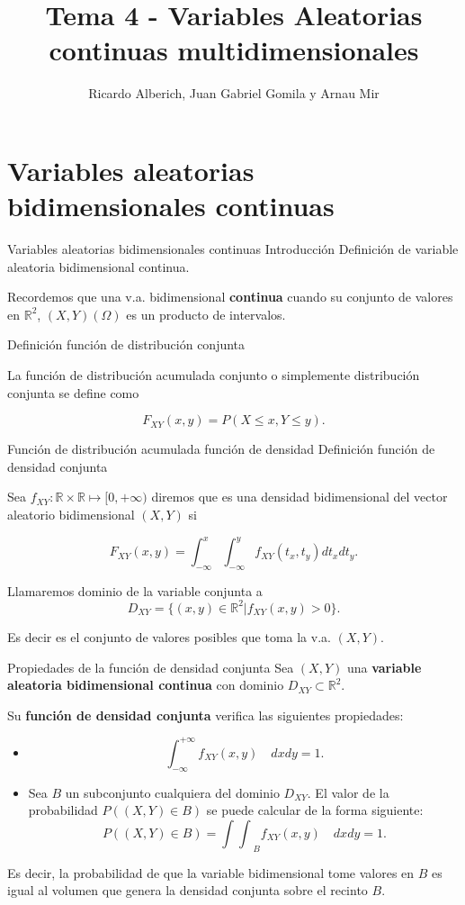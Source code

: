 \documentclass[
  ignorenonframetext,
]{beamer}
\title{Tema 4 - Variables Aleatorias continuas multidimensionales}
\author{Ricardo Alberich, Juan Gabriel Gomila y Arnau Mir}
\date{}
\begin{document}
\frame{\titlepage}

\hypertarget{variables-aleatorias-bidimensionales-continuas}{%
\section{Variables aleatorias bidimensionales
continuas}\label{variables-aleatorias-bidimensionales-continuas}}

\begin{frame}{Variables aleatorias bidimensionales continuas
Introducción}
\protect\hypertarget{variables-aleatorias-bidimensionales-continuas-introducciuxf3n}{}
Definición de variable aleatoria bidimensional continua.

Recordemos que una v.a. bidimensional \textbf{continua} cuando su
conjunto de valores en \(\mathbb{R}^2\), \((X,Y)(\Omega)\) es un
producto de intervalos.

Definición función de distribución conjunta

La función de distribución acumulada conjunto o simplemente distribución
conjunta se define como

\[F_{XY}(x,y)=P(X\leq x,Y\leq y).\]
\end{frame}

\begin{frame}{Función de distribución acumulada función de densidad}
\protect\hypertarget{funciuxf3n-de-distribuciuxf3n-acumulada-funciuxf3n-de-densidad}{}
Definición función de densidad conjunta

Sea \(f_{XY}: \mathbb{R}\times \mathbb{R}\mapsto [0,+\infty)\) diremos
que es una densidad bidimensional del vector aleatorio bidimensional
\((X,Y)\) si

\[F_{XY}(x,y)=\int_{-\infty}^{x}\int_{-\infty}^{y} f_{XY}(t_x,t_y) dt_xdt_y.\]

Llamaremos dominio de la variable conjunta a
\[D_{XY}=\{(x,y)\in \mathbb{R}^2 | f_{XY}(x,y)>0\}.\]

Es decir es el conjunto de valores posibles que toma la v.a. \((X,Y)\).
\end{frame}

\begin{frame}{Propiedades de la función de densidad conjunta}
\protect\hypertarget{propiedades-de-la-funciuxf3n-de-densidad-conjunta}{}
Sea \((X,Y)\) una \textbf{variable aleatoria bidimensional continua} con
dominio \(D_{XY}\subset \mathbb{R}^2\).

Su \textbf{función de densidad conjunta} verifica las siguientes
propiedades:

\begin{itemize}
\item
  \[\int_{-\infty}^{+\infty} f_{XY}(x,y)\quad  dx dy=1.\]
\item
  Sea \(B\) un subconjunto cualquiera del dominio \(D_{XY}\). El valor
  de la probabilidad \(P((X,Y)\in B)\) se puede calcular de la forma
  siguiente: \[
  P((X,Y)\in B) ={\int\int}_B f_{XY}(x,y)\quad  dx dy=1.
  \]
\end{itemize}

Es decir, la probabilidad de que la variable bidimensional tome valores
en \(B\) es igual al volumen que genera la densidad conjunta sobre el
recinto \(B\).
\end{frame}
\end{document}
